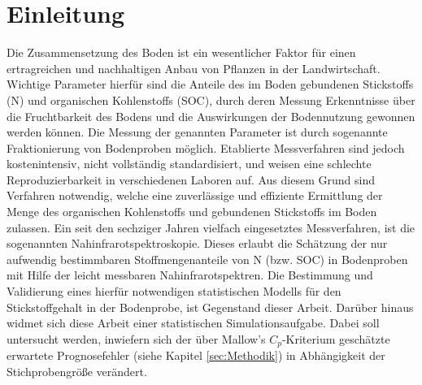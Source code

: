 \section{Einleitung}
\label{sec:Einleitung}
    Die Zusammensetzung des Boden ist ein wesentlicher Faktor für einen ertragreichen und nachhaltigen Anbau von Pflanzen in der Landwirtschaft.
    Wichtige Parameter hierfür sind die Anteile des im Boden gebundenen Stickstoffs (N) und organischen Kohlenstoffs (SOC), durch deren Messung Erkenntnisse über die Fruchtbarkeit des Bodens und die Auswirkungen der Bodennutzung gewonnen werden können.\cite{Poeplau2013}
    Die Messung der genannten Parameter ist durch sogenannte Fraktionierung von Bodenproben möglich.
    Etablierte Messverfahren sind jedoch kostenintensiv, nicht vollständig standardisiert, und weisen eine schlechte Reproduzierbarkeit in verschiedenen Laboren auf.\cite{Poeplau2013}
    Aus diesem Grund sind Verfahren notwendig, welche eine zuverlässige und effiziente Ermittlung der Menge des organischen Kohlenstoffs und gebundenen Stickstoffs im Boden zulassen.
    Ein seit den sechziger Jahren vielfach eingesetztes Messverfahren, ist die sogenannten Nahinfrarotspektroskopie.\cite{Agelet2010}
    Dieses erlaubt die Schätzung der nur aufwendig bestimmbaren Stoffmengenanteile von N (bzw. SOC) in Bodenproben mit Hilfe der leicht messbaren Nahinfrarotspektren.
    Die Bestimmung und Validierung eines hierfür notwendigen statistischen Modells für den Stickstoffgehalt in der Bodenprobe, ist Gegenstand dieser Arbeit.
    Darüber hinaus widmet sich diese Arbeit einer statistischen Simulationsaufgabe.
    Dabei soll untersucht werden, inwiefern sich der über Mallow's $C_p$-Kriterium geschätzte erwartete Prognosefehler (siehe Kapitel \ref{sec:Methodik}) in Abhängigkeit der Stichprobengröße verändert.

